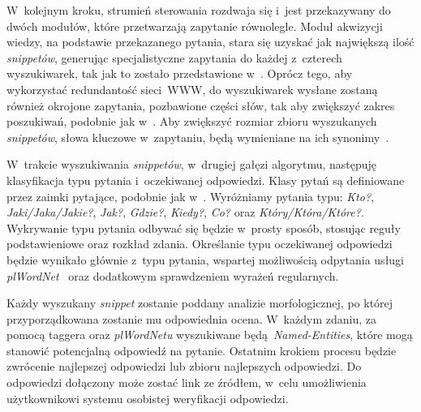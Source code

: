 W~kolejnym kroku, strumień sterowania rozdwaja się i~jest przekazywany do dwóch modułów, które przetwarzają zapytanie równolegle. Moduł akwizycji wiedzy, na podstawie przekazanego pytania, stara się uzyskać jak największą ilość \emph{snippetów}, generując specjalistyczne zapytania do każdej z~czterech wyszukiwarek, tak jak to zostało przedstawione w~\cite{zheng2002answerbus}. Oprócz tego, aby wykorzystać redundantość sieci~WWW, do wyszukiwarek wysłane zostaną również okrojone zapytania, pozbawione części słów, tak aby zwiększyć zakres poszukiwań, podobnie jak w~\cite{brill2002analysis}. Aby zwiększyć rozmiar zbioru wyszukanych \emph{snippetów}, słowa kluczowe w~zapytaniu, będą wymieniane na ich synonimy~\cite{przybyla-2013-question}.

W~trakcie wyszukiwania \emph{snippetów}, w~drugiej gałęzi algorytmu, następuję klasyfikacja typu pytania i~oczekiwanej odpowiedzi. Klasy pytań są definiowane przez zaimki pytające, podobnie jak w~\cite{gupta2012survey}. Wyróżniamy pytania typu: \emph{Kto?}, \emph{Jaki/Jaka/Jakie?}, \emph{Jak?}, \emph{Gdzie?}, \emph{Kiedy?}, \emph{Co?} oraz \emph{Który/Która/Które?}. Wykrywanie typu pytania odbywać się będzie w~prosty sposób, stosując reguły podstawieniowe oraz rozkład zdania. Określanie typu oczekiwanej odpowiedzi będzie wynikało głównie z~typu pytania, wspartej możliwością odpytania usługi \emph{plWordNet}~\cite{MazPiaRudSzpaKedz:16} oraz dodatkowym sprawdzeniem wyrażeń regularnych.

Każdy wyszukany \emph{snippet} zostanie poddany analizie morfologicznej, po której przyporządkowana zostanie mu odpowiednia ocena. W~każdym zdaniu, za pomocą taggera oraz \emph{plWordNetu} wyszukiwane będą \emph{Named-Entities}, które mogą stanowić potencjalną odpowiedź na pytanie. Ostatnim krokiem procesu będzie zwrócenie najlepszej odpowiedzi lub zbioru najlepszych odpowiedzi. Do odpowiedzi dołączony może zostać link ze źródłem, w~celu umożliwienia użytkownikowi systemu osobistej weryfikacji odpowiedzi.


